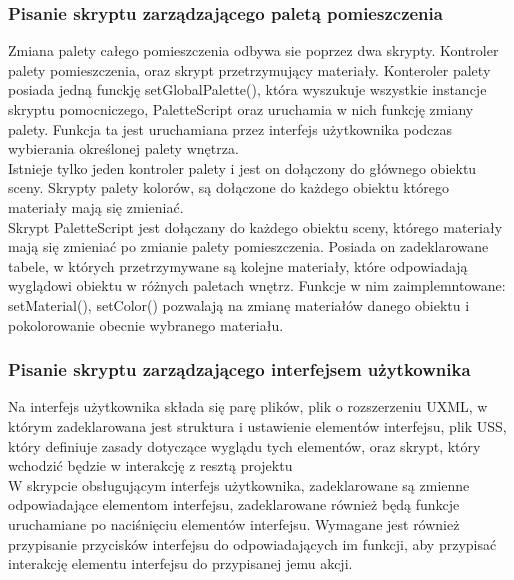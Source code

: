 \documentclass{article} %
\begin{document}
        \subsubsection*{Pisanie skryptu zarządzającego paletą pomieszczenia}
            Zmiana palety całego pomieszczenia odbywa sie poprzez dwa skrypty. Kontroler palety pomieszczenia, oraz skrypt przetrzymujący materiały. Konteroler palety posiada jedną funckję setGlobalPalette(), która wyszukuje wszystkie instancje skryptu pomocniczego, PaletteScript oraz uruchamia w nich funkcję zmiany palety. Funkcja ta jest uruchamiana przez interfejs użytkownika podczas wybierania określonej palety wnętrza.
            \\
            
            Istnieje tylko jeden kontroler palety i jest on dołączony do głównego obiektu sceny. Skrypty palety kolorów, są dołączone do każdego obiektu którego materiały mają się zmieniać.
            \\
            
            Skrypt PaletteScript jest dołączany do każdego obiektu sceny, którego materiały mają się zmieniać po zmianie palety pomieszczenia. Posiada on zadeklarowane tabele, w których przetrzymywane są kolejne materiały, które odpowiadają wyglądowi obiektu w różnych paletach wnętrz. Funkcje w nim zaimplemntowane: setMaterial(), setColor() pozwalają na zmianę materiałów danego obiektu i pokolorowanie obecnie wybranego materiału.
            \\
            
        \subsubsection*{Pisanie skryptu zarządzającego interfejsem użytkownika}
            Na interfejs użytkownika składa się parę plików, plik o rozszerzeniu UXML, w którym zadeklarowana jest struktura i ustawienie elementów interfejsu, plik USS, który definiuje zasady dotyczące wyglądu tych elementów, oraz skrypt, który wchodzić będzie w interakcję z resztą projektu
            \\
            
            W skrypcie obsługującym interfejs użytkownika, zadeklarowane są zmienne odpowiadające elementom interfejsu, zadeklarowane również będą funkcje uruchamiane po naciśnięciu elementów interfejsu. Wymagane jest również przypisanie przycisków interfejsu do odpowiadających im funkcji, aby przypisać interakcję elementu interfejsu do przypisanej jemu akcji.
            \\
            
\end{document}
